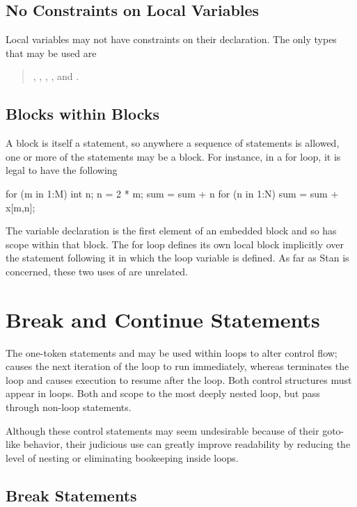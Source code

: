 \subsection{No Constraints on Local Variables}

Local variables may not have constraints on their declaration.  The
only types that may be used are
%
\begin{quote}
, ,
, , and .
\end{quote}

\subsection{Blocks within Blocks}

A block is itself a statement, so anywhere a sequence of statements is
allowed, one or more of the statements may be a block.  For instance,
in a for loop, it is legal to have the following
%
\begin{stancode}
for (m in 1:M) {
  {
     int n;
     n = 2 * m;
     sum = sum + n
  }
  for (n in 1:N)
    sum = sum + x[m,n];
}
\end{stancode}
%
The variable declaration  is the first element of an
embedded block and so has scope within that block.  The for loop
defines its own local block implicitly over the statement following it
in which the loop variable is defined.  As far as Stan is concerned,
these two uses of  are unrelated.

\section{Break and Continue Statements}

The one-token statements  and  may be used
within loops to alter control flow;   causes the next
iteration of the loop to run immediately, whereas 
terminates the loop and causes execution to resume after the loop.
Both control structures must appear in loops.  Both  and
 scope to the most deeply nested loop, but pass through
non-loop statements.

Although these control statements may seem undesirable because of
their goto-like behavior, their judicious use can greatly improve
readability by reducing the level of nesting or eliminating bookeeping
inside loops.

\subsection{Break Statements}

